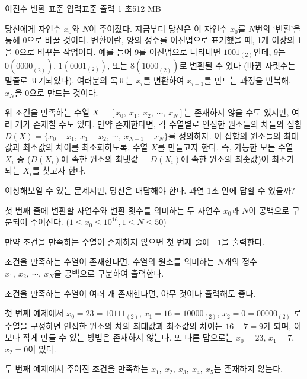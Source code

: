 \begin{problem}{이진수 변환}
    {표준 입력}{표준 출력}
    {1 초}{512 MB}{}
    
    당신에게 자연수 $ x_0 $와 $ N $이 주어졌다. 지금부터 당신은 이 자연수 $ x_0 $를 $ N $번의 `변환'을 통해 0으로 바꿀 것이다. 변환이란, 양의 정수를 이진법으로 표기했을 때, 1개 이상의 1을 0으로 바꾸는 작업이다. 예를 들어 9를 이진법으로 나타내면 $ 1001_{(2)} $인데, 9는 $ 0(\underline{0}00\underline{0}_{(2)}) $, $ 1(\underline{0}001_{(2)}) $, 또는 $ 8(100\underline{0}_{(2)}) $로 변환될 수 있다 (바뀐 자릿수는 밑줄로 표기되었다). 여러분의 목표는 $ x_i $를 변환하여 $ x_{i+1} $를 만드는 과정을 반복해, $ x_N $을 0으로 만드는 것이다.
    
    위 조건을 만족하는 수열 $ X = [x_0,\ x_1,\ x_2,\ \cdots,\ x_N ]$는 존재하지 않을 수도 있지만, 여러 개가 존재할 수도 있다. 만약 존재한다면, 각 수열별로 인접한 원소들의 차들의 집합 $ D(X) = \{x_0-x_1,\ x_1-x_2,\ \cdots, \ x_{N-1}-x_N\} $를 정의하자. 이 집합의 원소들의 최대값과 최소값의 차이를 최소화하도록, 수열 $ X $를 만들고자 한다. 즉, 가능한 모든 수열 $ X_i $ 중 ($ D(X_i) $에 속한 원소의 최댓값 $ - $ $ D(X_i) $에 속한 원소의 최솟값)이 최소가 되는 $ X_i $를 찾고자 한다.
    
    이상해보일 수 있는 문제지만, 당신은 대답해야 한다. 과연 1초 안에 답할 수 있을까?
    
    
    \InputFile
    
    첫 번째 줄에 변환할 자연수와 변환 횟수를 의미하는 두 자연수 $ x_0 $과 $ N $이 공백으로 구분되어 주어진다. ($ 1 \leq x_0 \leq 10^{16} , 1 \leq N \leq 50 $)
    
    \OutputFile
    만약 조건을 만족하는 수열이 존재하지 않으면 첫 번째 줄에 \verb|-1|을 출력한다.
    
    조건을 만족하는 수열이 존재한다면, 수열의 원소를 의미하는 $ N $개의 정수 $ x_1,\ x_2,\ \cdots,\ x_N $을 공백으로 구분하여 출력한다.
    
    조건을 만족하는 수열이 여러 개 존재한다면, 아무 것이나 출력해도 좋다.
    
    \Examples
    
    \begin{example}
    \end{example}
    
    \Explanation
    
    첫 번째 예제에서 $ x_0 = 23 = 10111_{(2)} $, $ x_1 = 16 = 10000_{(2)} $, $ x_2 = 0 = 00000_{(2)} $ 로 수열을 구성하면 인접한 원소의 차의 최대값과 최소값의 차이는 $ 16 - 7 = 9 $가 되며, 이보다 작게 만들 수 있는 방법은 존재하지 않는다. 또 다른 답으로는 $ x_0 = 23 $, $ x_1 = 7 $, $ x_2 = 0 $이 있다.
    
    두 번째 예제에서 주어진 조건을 만족하는 $ x_1,\ x_2,\ x_3,\ x_4,\ x_5 $는 존재하지 않는다.
    
\end{problem}

